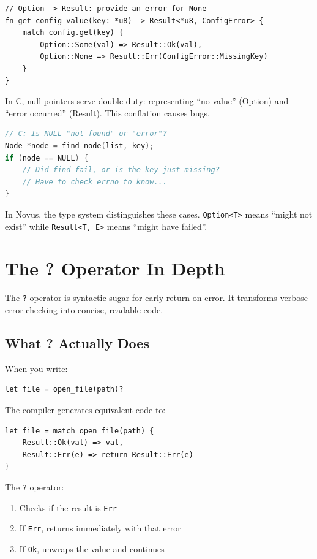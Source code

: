 \begin{lstlisting}
// Option -> Result: provide an error for None
fn get_config_value(key: *u8) -> Result<*u8, ConfigError> {
    match config.get(key) {
        Option::Some(val) => Result::Ok(val),
        Option::None => Result::Err(ConfigError::MissingKey)
    }
}
\end{lstlisting}

\begin{comingfromc}
In C, null pointers serve double duty: representing ``no value'' (Option) and ``error occurred'' (Result). This conflation causes bugs.

\begin{lstlisting}[language=C]
// C: Is NULL "not found" or "error"?
Node *node = find_node(list, key);
if (node == NULL) {
    // Did find fail, or is the key just missing?
    // Have to check errno to know...
}
\end{lstlisting}

In Novus, the type system distinguishes these cases. \texttt{Option<T>} means ``might not exist'' while \texttt{Result<T, E>} means ``might have failed''.
\end{comingfromc}

\section{The ? Operator In Depth}
\label{sec:question-operator}

The \texttt{?} operator is syntactic sugar for early return on error. It transforms verbose error checking into concise, readable code.

\subsection{What ? Actually Does}

When you write:
\begin{lstlisting}
let file = open_file(path)?
\end{lstlisting}

The compiler generates equivalent code to:
\begin{lstlisting}
let file = match open_file(path) {
    Result::Ok(val) => val,
    Result::Err(e) => return Result::Err(e)
}
\end{lstlisting}

The \texttt{?} operator:
\begin{enumerate}
    \item Checks if the result is \texttt{Err}
    \item If \texttt{Err}, returns immediately with that error
    \item If \texttt{Ok}, unwraps the value and continues
\end{enumerate}

